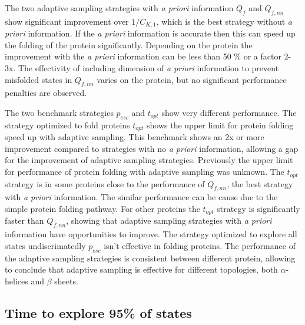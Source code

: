The two adaptive sampling strategies with \emph{a priori} information $Q_{f}$ and $Q_{f,nn}$ show significant improvement over $1/C_{K, 1}$, which is the best strategy without \emph{a priori} information. If the \emph{a priori} information is accurate then this can speed up the folding of the protein significantly. Depending on the protein the improvement with the \emph{a priori} information can be less than 50
\% or a factor 2-3x. The effectivity of including dimension of \emph{a priori} information to prevent misfolded states in  $Q_{f,nn}$ varies on the protein, but no significant performance penalties are observed.

The two benchmark strategies $p_{esc}$ and $t_{opt}$ show very different performance. The strategy optimized to fold proteins $t_{opt}$  shows the upper limit for protein folding speed up with adaptive sampling. This benchmark shows an 2x or more improvement compared to strategies with no \emph{a priori} information, allowing a gap for the improvement of adaptive sampling strategies. Previously the upper limit for performance of protein folding with adaptive sampling was unknown. The $t_{opt}$ strategy is in some proteins close to the performance of $Q_{f,nn}$, the best strategy with \emph{a priori} information. The similar performance can be cause due to the simple protein folding pathway. For other proteins the $t_{opt}$ strategy is significantly faster than $Q_{f,nn}$, showing that adaptive sampling strategies with \emph{a priori} information have opportunities to improve. The strategy optimized to explore all states undiscrimatedly $p_{esc}$ isn't effective in folding proteins. The performance of the adaptive sampling strategies is consistent between different protein, allowing to conclude that adaptive sampling is effective for different topologies, both $\alpha$-helices and $\beta$ sheets.

\subsection{\label{sec:time-explore}Time to explore 95\% of states}

